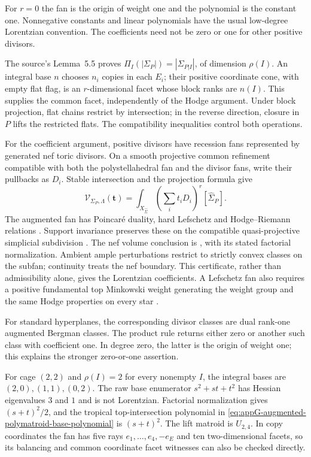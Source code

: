 For $r=0$ the fan is the origin of weight one and the
polynomial is the constant one. Nonnegative constants and
linear polynomials have the usual low-degree Lorentzian
convention. The coefficients need not be zero or one for
other positive divisors.

The source's Lemma~5.5 proves
$\Pi_I(|\Sigma_P|)=|\Sigma_{P|I}|$, of dimension $\rho(I)$.
An integral base $n$ chooses $n_i$ copies in each $E_i$;
their positive coordinate cone, with empty flat flag, is an
$r$-dimensional facet whose block ranks are $n(I)$.
This supplies the common facet, independently of the Hodge
argument. Under block projection, flat chains restrict by
intersection; in the reverse direction, closure in $P$ lifts
the restricted flats. The compatibility inequalities control
both operations.

For the coefficient argument, positive divisors have recession
fans represented by generated nef toric divisors. On a smooth
projective common refinement compatible with both the
polystellahedral fan and the divisor fans, write their pullbacks
as $D_i$. Stable intersection and the projection formula give
\[
 \mathcal V_{\Sigma_P,\Lambda}(\mathbf t)
     =\int_{X_{\widehat\Sigma}}
           \left(\sum_i t_iD_i\right)^r[\widehat\Sigma_P].
\]
The augmented fan has Poincar\'e duality, hard Lefschetz and
Hodge--Riemann relations
\cite[Theorem~3.17]{EurLarson23PolymatroidsV2}.
Support invariance preserves these on the compatible
quasi-projective simplicial subdivision
\cite[Theorem~1.6]{ArdilaDenhamHuh22LagrangianV4}.
The nef volume conclusion is
\cite[Theorem~8.3(4)]{EurHuhLarson23StellahedralV3},
with its stated factorial normalization. Ambient ample
perturbations restrict to strictly convex classes on the
subfan; continuity treats the nef boundary.
This certificate, rather than admissibility alone, gives the
Lorentzian coefficients. A Lefschetz fan also requires a
positive fundamental top Minkowski weight generating the
weight group and the same Hodge properties on every star
\cite[Definition~1.5]{ArdilaDenhamHuh22LagrangianV4}.

For standard hyperplanes, the corresponding divisor classes
are dual rank-one augmented Bergman classes. The product rule
\cite[Theorem~3.14 and Corollary~3.15]{EurLarson23PolymatroidsV2}
returns either zero or another such class with coefficient one.
In degree zero, the latter is the origin of weight one; this
explains the stronger zero-or-one assertion.

\begin{example}
\label{ex:appG-augmented-rank-two-normalization}
For cage $(2,2)$ and $\rho(I)=2$ for every nonempty $I$,
the integral bases are $(2,0),(1,1),(0,2)$.
The raw base enumerator $s^2+st+t^2$ has Hessian eigenvalues
$3$ and $1$ and is not Lorentzian. Factorial normalization
gives $(s+t)^2/2$, and the tropical top-intersection polynomial
in \eqref{eq:appG-augmented-polymatroid-base-polynomial} is
$(s+t)^2$. The lift matroid is $U_{2,4}$. In copy coordinates
the fan has five rays $e_1,\ldots,e_4,-e_E$ and ten
two-dimensional facets, so its balancing and common coordinate
facet witnesses can also be checked directly.
\end{example}

